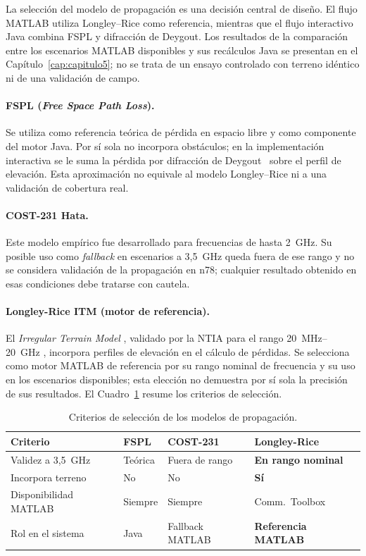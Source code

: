 La selección del modelo de propagación es una decisión central de diseño. El flujo MATLAB
utiliza Longley--Rice como referencia, mientras que el flujo interactivo Java combina
FSPL y difracción de Deygout. Los resultados de la comparación entre los escenarios MATLAB
disponibles y sus recálculos Java se presentan en el Capítulo~\ref{cap:capitulo5}; no se
trata de un ensayo controlado con terreno idéntico ni de una validación de campo.

\paragraph{FSPL (\textit{Free Space Path Loss}).} Se utiliza como referencia teórica de
pérdida en espacio libre y como componente del motor Java. Por sí sola no incorpora
obstáculos; en la implementación interactiva se le suma la pérdida por difracción de
Deygout~\cite{deygout1966multiple} sobre el perfil de elevación. Esta aproximación no
equivale al modelo Longley--Rice ni a una validación de cobertura real.

\paragraph{COST-231 Hata.} Este modelo empírico fue desarrollado para frecuencias de hasta
2~GHz. Su posible uso como \textit{fallback} en escenarios a 3,5~GHz queda fuera de ese
rango y no se considera validación de la propagación en n78; cualquier resultado obtenido
en esas condiciones debe tratarse con cautela.

\paragraph{Longley-Rice ITM (motor de referencia).} El \textit{Irregular Terrain Model}
\cite{longley1968transmission}, validado por la NTIA para el rango 20~MHz--20~GHz
\cite{hufford1982guide}, incorpora perfiles de elevación en el cálculo de pérdidas. Se
selecciona como motor MATLAB de referencia por su rango nominal de frecuencia y su uso en
los escenarios disponibles; esta elección no demuestra por sí sola la precisión de sus
resultados. El
Cuadro~\ref{tab:comp_modelos} resume los criterios de selección.

\begin{table}[H]
\centering
\caption{Criterios de selección de los modelos de propagación.}
\label{tab:comp_modelos}
\small
\begin{tabularx}{\textwidth}{|X|X|X|X|}
\hline
\textbf{Criterio} & \textbf{FSPL} & \textbf{COST-231} & \textbf{Longley-Rice} \\
\hline
Validez a 3,5~GHz       & Teórica & Fuera de rango & \textbf{En rango nominal} \\
Incorpora terreno        & No             & No                   & \textbf{Sí} \\
Disponibilidad MATLAB    & Siempre        & Siempre              & Comm.~Toolbox \\
Rol en el sistema        & Java & Fallback MATLAB & \textbf{Referencia MATLAB} \\
\hline
\end{tabularx}
\end{table}

